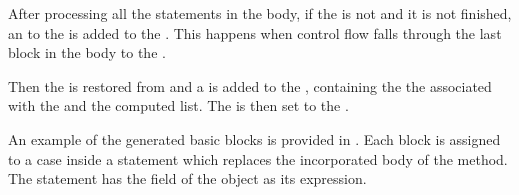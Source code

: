 After processing all the statements in the  body, if the  is not 
and it is not finished, an  to the  is added to the
. This happens when control flow falls through the last block in the  body to
the .

Then the  is restored from  and a  is added to the
, containing the the  associated with the  and the
computed  list. The  is then set to the .

An example of the generated basic blocks is provided in . Each block is assigned to
a case inside a  statement which replaces the incorporated body of the method. The  statement
has the  field of the  object as its expression.

